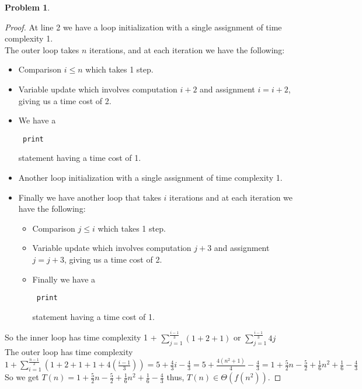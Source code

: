 \documentclass[11pt]{article}
\theoremstyle{definition}
\theoremstyle{definition}
\newtheorem{required}{Problem}
\theoremstyle{definition}
\begin{document}
\begin{required}
\begin{proof}	At line 2 we have a loop initialization with a single assignment of time complexity 1.\\ 
	The outer loop takes $n$ iterations, and at each iteration we have the following:\\
	\begin{itemize}[]\item Comparison $i \leq n$ which takes 1 step.
		\item Variable update which involves computation $i + 2$ and assignment $i = i + 2$, giving us a time cost of 2.
		\item We have a \begin{verbatim} print \end{verbatim} statement having a time cost of 1.
		\item Another loop initialization with a single assignment of time complexity 1.
		\item Finally we have another loop that takes $i$ iterations and at each iteration we have the following:\\
		\begin{itemize}[]\item Comparison $j \leq i$ which takes 1 step.
			\item Variable update which involves computation $j + 3$ and assignment $j = j + 3$, giving us a time cost of 2.
			\item Finally we have a \begin{verbatim} print \end{verbatim} statement having a time cost of 1.
		\end{itemize}
	\end{itemize}
	So the inner loop has time complexity 1 + $\displaystyle\sum_{j=1} ^{\frac{i - 1}{3}} (1 + 2 + 1)$ or $\displaystyle\sum_{j=1} ^{\frac{i - 1}{3}} 4j$\\
	The outer loop has time complexity $ 1 + \displaystyle\sum_{i=1} ^{\frac{n - 1}{2}} (1 + 2 + 1 + 1 + 4(\frac{i - 1}{3})) = 5 + \frac{4}{3}i - \frac{4}{3} = 5 + \frac{4(n^{2}+1)}{4} - \frac{4}{3} = 1 + \frac{5}{2}n - \frac{5}{2} + \frac{1}{6}n^{2}+ \frac{1}{6}-\frac{4}{3}$\\
	So we get $T(n) = 1 + \frac{5}{2}n - \frac{5}{2} + \frac{1}{6}n^{2}+ \frac{1}{6}-\frac{4}{3}$ thus, $T(n) \in \Theta(f(n^2))$.
\end{proof}

\end{required}
\end{document}
